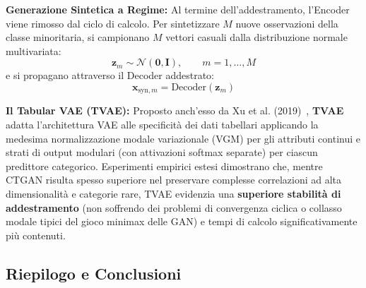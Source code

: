\textbf{Generazione Sintetica a Regime:}
Al termine dell'addestramento, l'Encoder viene rimosso dal ciclo di calcolo. Per sintetizzare $M$ nuove osservazioni della classe minoritaria, si campionano $M$ vettori casuali dalla distribuzione normale multivariata:
\begin{equation}
    \mathbf{z}_m \sim \mathcal{N}(\mathbf{0}, \mathbf{I}), \qquad m = 1, \dots, M
\end{equation}
e si propagano attraverso il Decoder addestrato:
\begin{equation}
    \mathbf{x}_{\text{syn}, m} = \text{Decoder}(\mathbf{z}_m)
\end{equation}

\textbf{Il Tabular VAE (TVAE):}
Proposto anch'esso da Xu et al. (2019)~\cite{xu2019}, \textbf{TVAE} adatta l'architettura VAE alle specificità dei dati tabellari applicando la medesima normalizzazione modale variazionale (VGM) per gli attributi continui e strati di output modulari (con attivazioni softmax separate) per ciascun predittore categorico. Esperimenti empirici estesi dimostrano che, mentre CTGAN risulta spesso superiore nel preservare complesse correlazioni ad alta dimensionalità e categorie rare, TVAE evidenzia una \textbf{superiore stabilità di addestramento} (non soffrendo dei problemi di convergenza ciclica o collasso modale tipici del gioco minimax delle GAN) e tempi di calcolo significativamente più contenuti.
\FloatBarrier
\subsection{Riepilogo e Conclusioni}
\label{sec:dm-ch24-conclusioni}

